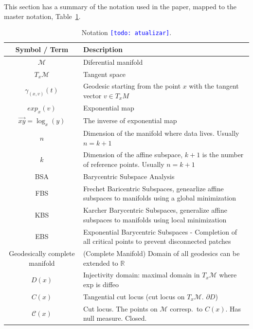 \documentclass[a4paper,titlepage]{article}
\newcommand{\indraftnote}[1]{\textcolor{blue}{\texttt{\footnotesize [#1]}}}
\newcommand{\todo}[1]{\indraftnote{todo: #1}} %
\begin{document}
This section has a summary of the notation used in the paper, 
mapped to the master notation, Table~\ref{tab:notation}.
\begin{table}
  \renewcommand{\arraystretch}{1.4}
  \renewcommand{\tabcolsep}{0.2cm}
  \begin{center}
  \small
  \begin{tabularx}{\textwidth}{cX}
  \multicolumn{1}{c}{\textbf{Symbol / Term}} &
  \multicolumn{1}{l}{\textbf{Description}}\\\toprule
  $\mathcal M$ & Diferential manifold\\
  $T_x \mathcal M$& Tangent space\\
  $\gamma_{(x,v)}(t)$& Geodesic starting from the point $x$ with the tangent vector $v \in T_x M$\\
  $exp_x (v)$& Exponential map\\
  $\overrightarrow{xy}=\log_x (y)$& The inverse of exponential map\\
  $n$ & Dimension of the manifold where data lives. Usually $n=k+1$\\
  $k$ & Dimension of the affine subspace, $k+1$ is the number of reference
  points. Usually $n = k+1$ \\
  BSA & Barycentric Subspace Analysis\\
  FBS & Frechet Baricentric Subspaces, genearlize affine subspaces to
  manifolds using a global minimization\\
  KBS & Karcher Barycentric Subspaces, generalize affine subspaces to
  manifolds using local minimization\\
  EBS & Exponential Barycentric Subspaces - Completion of all critical points to
  prevent disconnected patches\\
  Geodesically complete manifold & (Complete Manifold) Domain of all geodesics can be extended to
  $\mathbb R$\\
  $D(x)$ & Injectivity domain: maximal domain in $T_x\mathcal M$ where exp is diffeo\\
  $C(x)$ & Tangential cut locus (cut locus on $T_x\mathcal M$. $\partial D$)\\
    $\mathcal C(x)$ & Cut locus. The points on $\mathcal M$ corresp.\ to $C(x)$.
    Has null measure. Closed.\\\bottomrule
 \end{tabularx}
 \end{center}
 \caption{Notation \todo{atualizar}.} 
 \label{tab:notation} 
\end{table}
\end{document}
